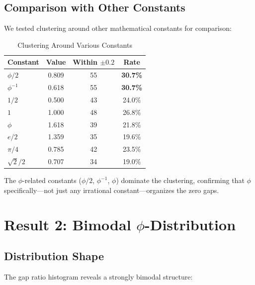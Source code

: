 \documentclass[11pt,a4paper]{article}
\begin{document}
\subsection{Comparison with Other Constants}

We tested clustering around other mathematical constants for comparison:

\begin{table}[H]
\centering
\caption{Clustering Around Various Constants}
\label{tab:constants}
\begin{tabular}{@{}lccc@{}}
\toprule
\textbf{Constant} & \textbf{Value} & \textbf{Within $\pm 0.2$} & \textbf{Rate} \\
\midrule
$\phi/2$ & 0.809 & 55 & \textbf{30.7\%} \\
$\phi^{-1}$ & 0.618 & 55 & \textbf{30.7\%} \\
$1/2$ & 0.500 & 43 & 24.0\% \\
$1$ & 1.000 & 48 & 26.8\% \\
$\phi$ & 1.618 & 39 & 21.8\% \\
$e/2$ & 1.359 & 35 & 19.6\% \\
$\pi/4$ & 0.785 & 42 & 23.5\% \\
$\sqrt{2}/2$ & 0.707 & 34 & 19.0\% \\
\bottomrule
\end{tabular}
\end{table}

The $\phi$-related constants ($\phi/2$, $\phi^{-1}$, $\phi$) dominate the clustering, confirming that $\phi$ specifically—not just any irrational constant—organizes the zero gaps.

\newpage

\section{Result 2: Bimodal $\phi$-Distribution}
\label{sec:bimodal}

\subsection{Distribution Shape}

The gap ratio histogram reveals a strongly bimodal structure:
\end{document}
